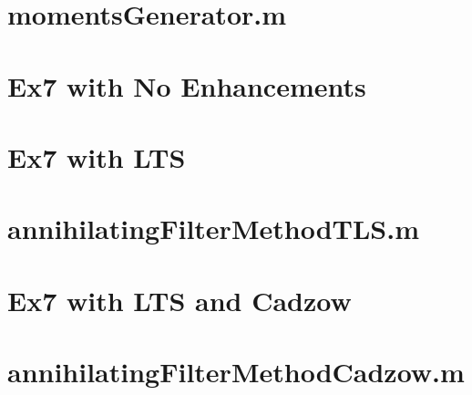 \documentclass[a4paper]{article}
\begin{document}
\section{momentsGenerator.m}


\section{Ex7 with No Enhancements}


\section{Ex7 with LTS}


\section{annihilatingFilterMethodTLS.m}


\section{Ex7 with LTS and Cadzow}


\section{annihilatingFilterMethodCadzow.m}

\end{document}
